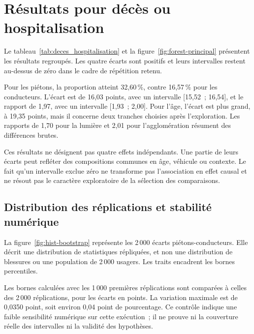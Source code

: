 \section{Résultats pour décès ou hospitalisation}
Le tableau~\ref{tab:deces_hospitalisation} et la figure~\ref{fig:forest-principal}
présentent les résultats regroupés. Les quatre écarts sont positifs et leurs
intervalles restent au-dessus de zéro dans le cadre de répétition retenu.


Pour les piétons, la proportion atteint 32,60\,\%, contre 16,57\,\% pour les conducteurs.
L'écart est de 16,03 points, avec un intervalle [15,52~; 16,54], et le rapport de 1,97,
avec un intervalle [1,93~; 2,00]. Pour l'âge, l'écart est plus grand, à 19,35 points,
mais il concerne deux tranches choisies après l'exploration. Les rapports de 1,70 pour
la lumière et 2,01 pour l'agglomération résument des différences brutes.

Ces résultats ne désignent pas quatre effets indépendants. Une partie de leurs écarts
peut refléter des compositions communes en âge, véhicule ou contexte. Le fait qu'un
intervalle exclue zéro ne transforme pas l'association en effet causal et ne résout
pas le caractère exploratoire de la sélection des comparaisons.
\FloatBarrier

\subsection{Distribution des réplications et stabilité numérique}
La figure~\ref{fig:hist-bootstrap} représente les 2\,000 écarts piétons-conducteurs.
Elle décrit une distribution de statistiques répliquées, et non une distribution de
blessures ou une population de 2\,000 usagers. Les traits encadrent les bornes percentiles.

Les bornes calculées avec les 1\,000 premières réplications sont comparées à celles
des 2\,000 réplications, pour les écarts en points. La variation maximale est de
0,0350 point, soit environ 0,04 point de pourcentage. Ce contrôle indique une faible
sensibilité numérique sur cette exécution~; il ne prouve ni la couverture réelle
des intervalles ni la validité des hypothèses.

\FloatBarrier

